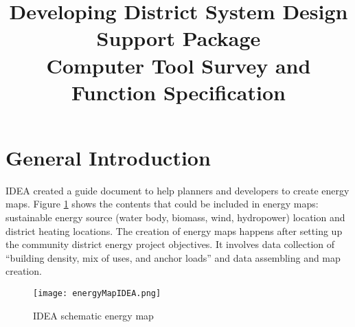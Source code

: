 \documentclass[hidelinks,12pt]{article}
\newcommand{\fref}[1]{Figure \ref{#1}}
\begin{document}
\title{Developing District System Design Support Package \\
       \large Computer Tool Survey and Function Specification}
\maketitle
\tableofcontents
\newpage
\section{General Introduction}
IDEA created a guide document to help planners and developers to
create energy maps. \fref{fig:energyMapIDEA} shows the contents that
could be included in energy maps: sustainable energy source (water
body, biomass, wind, hydropower) location and district heating
locations. The creation of energy maps happens after setting up the
community district energy project objectives. It involves data
collection of ``building density, mix of uses, and anchor loads''\cite
{IDEA2012} and data assembling and map creation.

\begin{figure}[h!]
  \centering
  \texttt{[image: energyMapIDEA.png]}
  \caption{IDEA schematic energy map~\cite{IDEA2012}}
  \label{fig:energyMapIDEA}
\end{figure}
\end{document}
